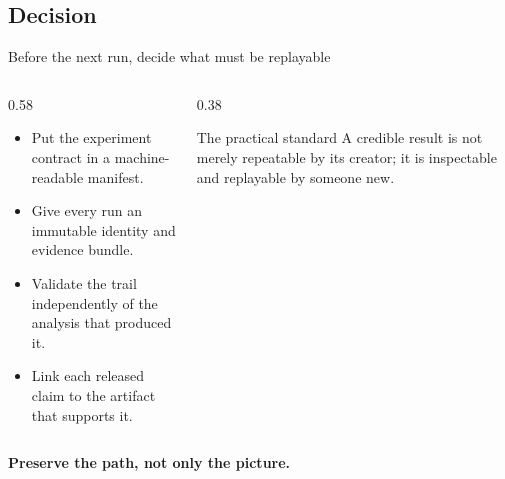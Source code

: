 \subsection{Decision}

\begin{frame}{Before the next run, decide what must be replayable}
  \begin{columns}[T,onlytextwidth]
    \begin{column}{0.58\textwidth}
      \begin{itemize}
        \item Put the experiment contract in a machine-readable manifest.
        \item Give every run an immutable identity and evidence bundle.
        \item Validate the trail independently of the analysis that produced it.
        \item Link each released claim to the artifact that supports it.
      \end{itemize}
    \end{column}
    \begin{column}{0.38\textwidth}
      \begin{exampleblock}{The practical standard}
        A credible result is not merely repeatable by its creator; it is inspectable
        and replayable by someone new.
      \end{exampleblock}
    \end{column}
  \end{columns}

  \vfill
  \centering
  {\color{SzegedBlue}\Large\bfseries Preserve the path, not only the picture.}
\end{frame}
